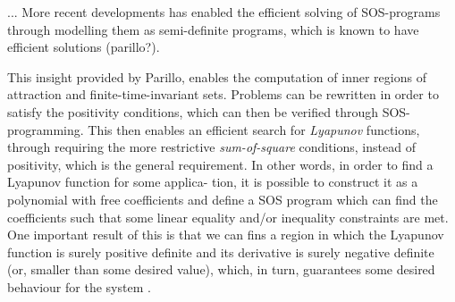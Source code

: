 ...
More recent developments has enabled the efficient solving of SOS-programs
through modelling them as semi-definite programs, which is known to have
efficient solutions (parillo?).

This insight provided by Parillo, enables the computation of inner regions of
attraction and finite-time-invariant sets. Problems can be rewritten in order to
satisfy the positivity conditions, which can then be verified through
SOS-programming. This then enables an efficient search for \textit{Lyapunov}
functions, through requiring the more restrictive \textit{sum-of-square}
conditions, instead of positivity, which is the general requirement. In other
words, in order to find a Lyapunov function for some applica- tion, it is
possible to construct it as a polynomial with free coefficients and define a SOS
program which can find the coefficients such that some linear equality and/or
inequality constraints are met. One important result of this is that we can fins
a region in which the Lyapunov function is surely positive definite and its
derivative is surely negative definite (or, smaller than some desired value),
which, in turn, guarantees some desired behaviour for the system \cite{PHD-Thesis}.

